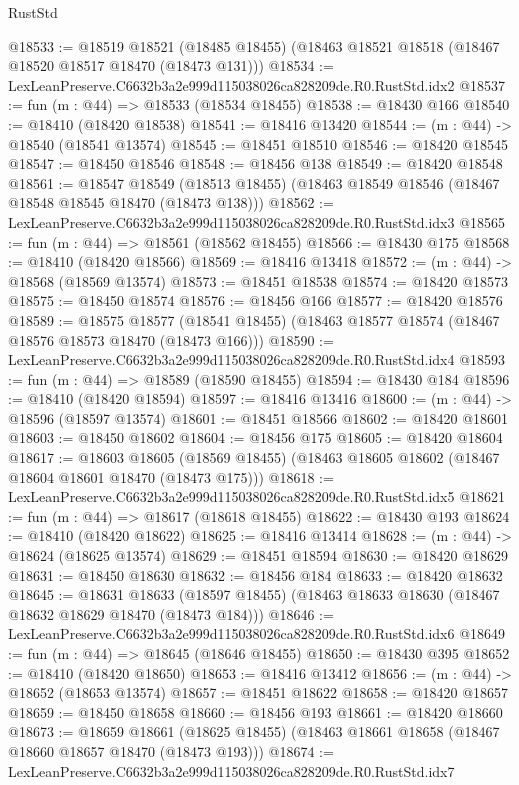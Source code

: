\begin{lexlean}{RustStd}
\begin{coremodule}
@18533 := @18519
    @18521
    (@18485 @18455)
    (@18463 @18521 @18518 (@18467 @18520 @18517 @18470 (@18473 @131)))
@18534 := LexLeanPreserve.C6632b3a2e999d115038026ca828209de.R0.RustStd.idx2
@18537 := fun (m : @44) => @18533 (@18534 @18455)
@18538 := @18430 @166
@18540 := @18410 (@18420 @18538)
@18541 := @18416 @13420
@18544 := (m : @44) -> @18540 (@18541 @13574)
@18545 := @18451 @18510
@18546 := @18420 @18545
@18547 := @18450 @18546
@18548 := @18456 @138
@18549 := @18420 @18548
@18561 := @18547
    @18549
    (@18513 @18455)
    (@18463 @18549 @18546 (@18467 @18548 @18545 @18470 (@18473 @138)))
@18562 := LexLeanPreserve.C6632b3a2e999d115038026ca828209de.R0.RustStd.idx3
@18565 := fun (m : @44) => @18561 (@18562 @18455)
@18566 := @18430 @175
@18568 := @18410 (@18420 @18566)
@18569 := @18416 @13418
@18572 := (m : @44) -> @18568 (@18569 @13574)
@18573 := @18451 @18538
@18574 := @18420 @18573
@18575 := @18450 @18574
@18576 := @18456 @166
@18577 := @18420 @18576
@18589 := @18575
    @18577
    (@18541 @18455)
    (@18463 @18577 @18574 (@18467 @18576 @18573 @18470 (@18473 @166)))
@18590 := LexLeanPreserve.C6632b3a2e999d115038026ca828209de.R0.RustStd.idx4
@18593 := fun (m : @44) => @18589 (@18590 @18455)
@18594 := @18430 @184
@18596 := @18410 (@18420 @18594)
@18597 := @18416 @13416
@18600 := (m : @44) -> @18596 (@18597 @13574)
@18601 := @18451 @18566
@18602 := @18420 @18601
@18603 := @18450 @18602
@18604 := @18456 @175
@18605 := @18420 @18604
@18617 := @18603
    @18605
    (@18569 @18455)
    (@18463 @18605 @18602 (@18467 @18604 @18601 @18470 (@18473 @175)))
@18618 := LexLeanPreserve.C6632b3a2e999d115038026ca828209de.R0.RustStd.idx5
@18621 := fun (m : @44) => @18617 (@18618 @18455)
@18622 := @18430 @193
@18624 := @18410 (@18420 @18622)
@18625 := @18416 @13414
@18628 := (m : @44) -> @18624 (@18625 @13574)
@18629 := @18451 @18594
@18630 := @18420 @18629
@18631 := @18450 @18630
@18632 := @18456 @184
@18633 := @18420 @18632
@18645 := @18631
    @18633
    (@18597 @18455)
    (@18463 @18633 @18630 (@18467 @18632 @18629 @18470 (@18473 @184)))
@18646 := LexLeanPreserve.C6632b3a2e999d115038026ca828209de.R0.RustStd.idx6
@18649 := fun (m : @44) => @18645 (@18646 @18455)
@18650 := @18430 @395
@18652 := @18410 (@18420 @18650)
@18653 := @18416 @13412
@18656 := (m : @44) -> @18652 (@18653 @13574)
@18657 := @18451 @18622
@18658 := @18420 @18657
@18659 := @18450 @18658
@18660 := @18456 @193
@18661 := @18420 @18660
@18673 := @18659
    @18661
    (@18625 @18455)
    (@18463 @18661 @18658 (@18467 @18660 @18657 @18470 (@18473 @193)))
@18674 := LexLeanPreserve.C6632b3a2e999d115038026ca828209de.R0.RustStd.idx7

\end{coremodule}
\end{lexlean}
